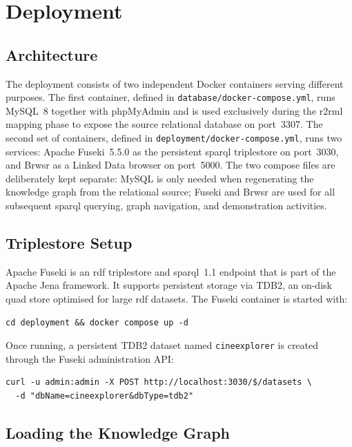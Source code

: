 \section{Deployment}
\label{sec:deployment}

\subsection{Architecture}

The deployment consists of two independent Docker containers serving different purposes. The first container, defined in \texttt{database/docker-compose.yml}, runs MySQL~8 together with phpMyAdmin and is used exclusively during the \ac{r2rml} mapping phase to expose the source relational database on port~3307. The second set of containers, defined in \texttt{deployment/docker-compose.yml}, runs two services: Apache Fuseki~5.5.0 as the persistent \ac{sparql} triplestore on port~3030, and Brwsr as a Linked Data browser on port~5000. The two compose files are deliberately kept separate: MySQL is only needed when regenerating the knowledge graph from the relational source; Fuseki and Brwsr are used for all subsequent \ac{sparql} querying, graph navigation, and demonstration activities.

\subsection{Triplestore Setup}

Apache Fuseki is an \ac{rdf} triplestore and \ac{sparql}~1.1 endpoint that is part of the Apache Jena framework. It supports persistent storage via TDB2, an on-disk quad store optimised for large \ac{rdf} datasets. The Fuseki container is started with:

\begin{verbatim}
cd deployment && docker compose up -d
\end{verbatim}

Once running, a persistent TDB2 dataset named \texttt{cineexplorer} is created through the Fuseki administration API:

\begin{verbatim}
curl -u admin:admin -X POST http://localhost:3030/$/datasets \
  -d "dbName=cineexplorer&dbType=tdb2"
\end{verbatim}

\subsection{Loading the Knowledge Graph}

